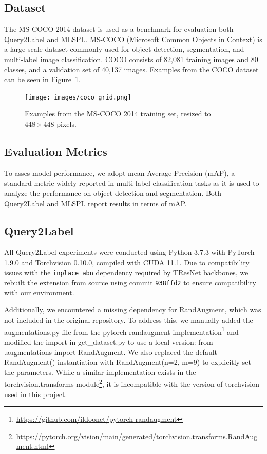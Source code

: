 \documentclass[lettersize,journal]{IEEEtran}
\begin{document}
\subsection{Dataset}
The MS-COCO 2014 \cite{coco14} dataset is used as a benchmark for evaluation both Query2Label and MLSPL. MS-COCO (Microsoft Common Objects in Context) is a large-scale dataset commonly used for object detection, segmentation, and multi-label image classification. COCO consists of 82,081 training images and 80 classes, and a validation set of 40,137 images. Examples from the COCO dataset can be seen in Figure~\ref{fig:coco-examples}.

\begin{figure}[t]
    \centering
    \texttt{[image: images/coco\_grid.png]}
    \caption{Examples from the MS-COCO 2014 training set, resized to $448 \times 448$ pixels.}
    \label{fig:coco-examples}
\end{figure}

\subsection{Evaluation Metrics}
To asses model performance, we adopt mean Average Precision (mAP), a standard metric widely reported in multi-label classification tasks as it is used to analyze the performance on object detection and segmentation. Both Query2Label and MLSPL report results in terms of mAP. 

\subsection{Query2Label}
All Query2Label experiments were conducted using Python 3.7.3 with PyTorch 1.9.0 and Torchvision 0.10.0, compiled with CUDA 11.1. Due to compatibility issues with the \texttt{inplace\_abn} dependency required by TResNet backbones, we rebuilt the extension from source using commit \texttt{938ffd2} to ensure compatibility with our environment.

Additionally, we encountered a missing dependency for RandAugment, which was not included in the original repository. To address this, we manually added the augmentations.py file from the pytorch-randaugment implementation\footnote{\url{https://github.com/ildoonet/pytorch-randaugment}} and modified the import in get\_dataset.py to use a local version: from .augmentations import RandAugment. We also replaced the default RandAugment() instantiation with RandAugment(n=2, m=9) to explicitly set the parameters. While a similar implementation exists in the torchvision.transforms module\footnote{\url{https://pytorch.org/vision/main/generated/torchvision.transforms.RandAugment.html}}, it is incompatible with the version of torchvision used in this project.
\end{document}
